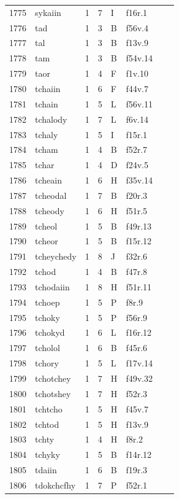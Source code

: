 \documentclass[11pt,a4paper]{article}
\begin{document}
\begin{landscape}
\begin{longtable}{@{}r>{\ttfamily}lrrl>{\ttfamily}l>{\raggedright\arraybackslash}p{80mm}>{\raggedright\arraybackslash}p{36mm}@{}}
1775 & sykaiin & 1 & 7 & I & f16r.1 &  & \\
1776 & tad & 1 & 3 & B & f56v.4 &  & \\
1777 & tal & 1 & 3 & B & f13v.9 &  & \\
1778 & tam & 1 & 3 & B & f54v.14 &  & \\
1779 & taor & 1 & 4 & F & f1v.10 &  & \\
1780 & tchaiin & 1 & 6 & F & f44v.7 &  & \\
1781 & tchain & 1 & 5 & L & f56v.11 &  & \\
1782 & tchalody & 1 & 7 & L & f6v.14 &  & \\
1783 & tchaly & 1 & 5 & I & f15r.1 &  & \\
1784 & tcham & 1 & 4 & B & f52r.7 &  & \\
1785 & tchar & 1 & 4 & D & f24v.5 &  & \\
1786 & tcheain & 1 & 6 & H & f35v.14 &  & \\
1787 & tcheodal & 1 & 7 & B & f20r.3 &  & \\
1788 & tcheody & 1 & 6 & H & f51r.5 &  & \\
1789 & tcheol & 1 & 5 & B & f49r.13 &  & \\
1790 & tcheor & 1 & 5 & B & f15r.12 &  & \\
1791 & tcheychedy & 1 & 8 & J & f32r.6 &  & \\
1792 & tchod & 1 & 4 & B & f47r.8 &  & \\
1793 & tchodaiin & 1 & 8 & H & f51r.11 &  & \\
1794 & tchoep & 1 & 5 & P & f8r.9 &  & \\
1795 & tchoky & 1 & 5 & P & f56r.9 &  & \\
1796 & tchokyd & 1 & 6 & L & f16r.12 &  & \\
1797 & tcholol & 1 & 6 & B & f45r.6 &  & \\
1798 & tchory & 1 & 5 & L & f17v.14 &  & \\
1799 & tchotchey & 1 & 7 & H & f49v.32 &  & \\
1800 & tchotshey & 1 & 7 & H & f52r.3 &  & \\
1801 & tchtcho & 1 & 5 & H & f45v.7 &  & \\
1802 & tchtod & 1 & 5 & H & f13v.9 &  & \\
1803 & tchty & 1 & 4 & H & f8r.2 &  & \\
1804 & tchyky & 1 & 5 & B & f14r.12 &  & \\
1805 & tdaiin & 1 & 6 & B & f19r.3 &  & \\
1806 & tdokchcfhy & 1 & 7 & P & f52r.1 &  & \\

\end{longtable}
\end{landscape}
\end{document}
